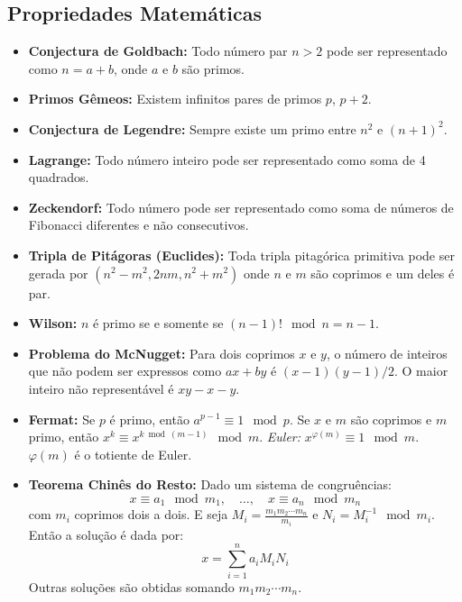 \subsection{Propriedades Matemáticas}

\begin{small}
\begin{itemize}
    \item \textbf{Conjectura de Goldbach:} Todo número par $n > 2$ pode ser representado como $n = a + b$, onde $a$ e $b$ são primos.

    \item \textbf{Primos Gêmeos:} Existem infinitos pares de primos $p$, $p + 2$.

    \item \textbf{Conjectura de Legendre:} Sempre existe um primo entre $n^2$ e $(n+1)^2$.

    \item \textbf{Lagrange:} Todo número inteiro pode ser representado como soma de 4 quadrados.

    \item \textbf{Zeckendorf:} Todo número pode ser representado como soma de números de Fibonacci diferentes e não consecutivos.

    \item \textbf{Tripla de Pitágoras (Euclides):} Toda tripla pitagórica primitiva pode ser gerada por $(n^2 - m^2, 2nm, n^2 + m^2)$ onde $n$ e $m$ são coprimos e um deles é par.

    \item \textbf{Wilson:} $n$ é primo se e somente se $(n-1)! \mod n = n - 1$.

    \item \textbf{Problema do McNugget:} Para dois coprimos $x$ e $y$, o número de inteiros que não podem ser expressos como $ax + by$ é $(x-1)(y-1)/2$. O maior inteiro não representável é $xy - x - y$.

    \item \textbf{Fermat:} Se $p$ é primo, então $a^{p-1} \equiv 1 \mod p$. Se $x$ e $m$ são coprimos e $m$ primo, então $x^k \equiv x^{k \bmod (m-1)} \mod m$.
          \textit{Euler:} $x^{\varphi(m)} \equiv 1 \mod m$. $\varphi(m)$ é o totiente de Euler.


    \item \textbf{Teorema Chinês do Resto:} Dado um sistema de congruências:
    \[
    x \equiv a_1 \mod m_1, \quad \ldots, \quad x \equiv a_n \mod m_n
    \]
    com $m_i$ coprimos dois a dois. E seja $M_i = \frac{m_1 m_2 \cdots m_n}{m_i}$ e $N_i = M_i^{-1} \mod m_i$. Então a solução é dada por: 
    \[
    x = \sum_{i=1}^{n} a_i M_i N_i
    \]
    Outras soluções são obtidas somando $m_1 m_2 \cdots m_n$.



\end{itemize}
\end{small}
